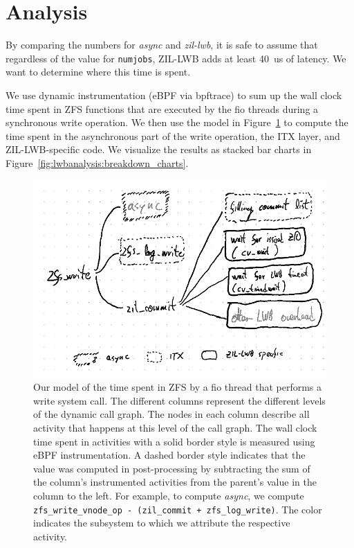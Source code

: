 \documentclass[12pt,a4paper,twoside]{book}
\begin{document}
\section{Analysis}\label{ch:lwb_analysis:breakdown}

By comparing the numbers for \textit{async} and \textit{zil-lwb}, it is safe to assume that regardless of the value for \lstinline{numjobs}, ZIL-LWB adds at least 40~us of latency.
We want to determine where this time is spent.

We use dynamic instrumentation (eBPF via bpftrace) to sum up the wall clock time spent in ZFS functions that are executed by the fio threads during a synchronous write operation.
We then use the model in Figure~\ref{fig:lwbanalysis:breakdown_model} to compute the time spent in the asynchronous part of the write operation, the ITX layer, and ZIL-LWB-specific code.
We visualize the results as stacked bar charts in Figure~\ref{fig:lwbanalysis:breakdown_charts}.

\begin{figure}[H]
    \centering
    \includegraphics{fig/zil_lwb_latency_analysis__breakdown}
    \caption{Our model of the time spent in ZFS by a fio thread that performs a write system call.
    The different columns represent the different levels of the dynamic call graph.
    The nodes in each column describe all activity that happens at this level of the call graph.
    The wall clock time spent in activities with a solid border style is measured using eBPF instrumentation.
    A dashed border style indicates that the value was computed in post-processing by subtracting the sum of the column's instrumented activities from the parent's value in the column to the left.
    For example, to compute \textit{async}, we compute \lstinline{zfs_write_vnode_op - (zil_commit + zfs_log_write)}.
    The color indicates the subsystem to which we attribute the respective activity.
    }
    \label{fig:lwbanalysis:breakdown_model}
\end{figure}
\end{document}
